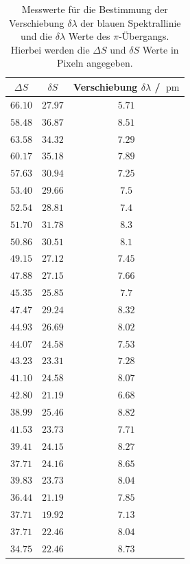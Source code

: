 \begin{table}
    \centering
    \caption{Messwerte für die Bestimmung der Verschiebung $\delta \lambda$ der blauen Spektrallinie und die $\delta\lambda$ Werte des $\pi$-Übergangs. Hierbei werden die $\Delta S$ und $\delta S$ Werte in Pixeln angegeben.}
    \label{tab:blau_pi}
    \begin{tabular}{c c c}
        \toprule
        $\Delta S$&$\delta S$&Verschiebung $\delta \lambda$ / $\SI{}{\pico\meter}$\\
        \midrule 
        $\num{66.10}$&$\num{27.97}$&$\num{5.71}$\\
        $\num{58.48}$&$\num{36.87}$&$\num{8.51}$\\
        $\num{63.58}$&$\num{34.32}$&$\num{7.29}$\\
        $\num{60.17}$&$\num{35.18}$&$\num{7.89}$\\
        $\num{57.63}$&$\num{30.94}$&$\num{7.25}$\\
        $\num{53.40}$&$\num{29.66}$&$\num{7.5}$\\
        $\num{52.54}$&$\num{28.81}$&$\num{7.4}$\\
        $\num{51.70}$&$\num{31.78}$&$\num{8.3}$\\
        $\num{50.86}$&$\num{30.51}$&$\num{8.1}$\\
        $\num{49.15}$&$\num{27.12}$&$\num{7.45}$\\
        $\num{47.88}$&$\num{27.15}$&$\num{7.66}$\\
        $\num{45.35}$&$\num{25.85}$&$\num{7.7}$\\
        $\num{47.47}$&$\num{29.24}$&$\num{8.32}$\\
        $\num{44.93}$&$\num{26.69}$&$\num{8.02}$\\
        $\num{44.07}$&$\num{24.58}$&$\num{7.53}$\\
        $\num{43.23}$&$\num{23.31}$&$\num{7.28}$\\
        $\num{41.10}$&$\num{24.58}$&$\num{8.07}$\\
        $\num{42.80}$&$\num{21.19}$&$\num{6.68}$\\
        $\num{38.99}$&$\num{25.46}$&$\num{8.82}$\\
        $\num{41.53}$&$\num{23.73}$&$\num{7.71}$\\
        $\num{39.41}$&$\num{24.15}$&$\num{8.27}$\\
        $\num{37.71}$&$\num{24.16}$&$\num{8.65}$\\
        $\num{39.83}$&$\num{23.73}$&$\num{8.04}$\\
        $\num{36.44}$&$\num{21.19}$&$\num{7.85}$\\
        $\num{37.71}$&$\num{19.92}$&$\num{7.13}$\\
        $\num{37.71}$&$\num{22.46}$&$\num{8.04}$\\
        $\num{34.75}$&$\num{22.46}$&$\num{8.73}$\\
        \bottomrule
    \end{tabular} 
\end{table}
